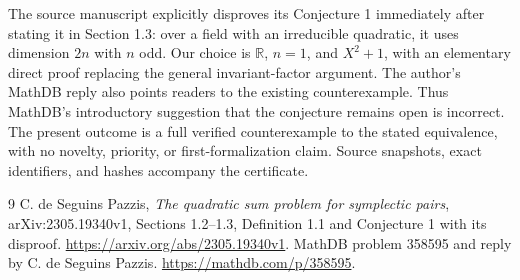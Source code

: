 \documentclass[11pt]{article}
\begin{document}
The source manuscript explicitly disproves its Conjecture 1 immediately after stating it in Section 1.3: over a field with an irreducible quadratic, it uses dimension $2n$ with $n$ odd. Our choice is $\mathbb R$, $n=1$, and $X^2+1$, with an elementary direct proof replacing the general invariant-factor argument. The author's MathDB reply also points readers to the existing counterexample. Thus MathDB's introductory suggestion that the conjecture remains open is incorrect. The present outcome is a full verified counterexample to the stated equivalence, with no novelty, priority, or first-formalization claim. Source snapshots, exact identifiers, and hashes accompany the certificate.
\begin{thebibliography}{9}
 C. de Seguins Pazzis, \emph{The quadratic sum problem for symplectic pairs}, arXiv:2305.19340v1, Sections 1.2--1.3, Definition 1.1 and Conjecture 1 with its disproof. \url{https://arxiv.org/abs/2305.19340v1}.
 MathDB problem 358595 and reply by C. de Seguins Pazzis. \url{https://mathdb.com/p/358595}.
\end{thebibliography}
\end{document}
